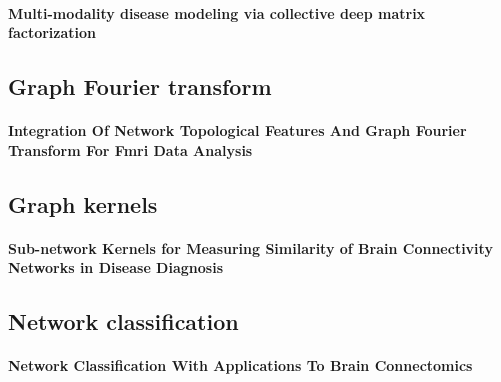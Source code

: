 \paragraph{Multi-modality disease modeling via collective deep matrix factorization}
\subsection{Graph Fourier transform}
\paragraph{Integration Of Network Topological Features And Graph Fourier Transform For Fmri Data Analysis}
\subsection{Graph kernels}
\paragraph{Sub-network Kernels for Measuring Similarity of Brain Connectivity Networks in Disease Diagnosis}
\subsection{Network classification}
\paragraph{Network Classification With Applications To Brain Connectomics}